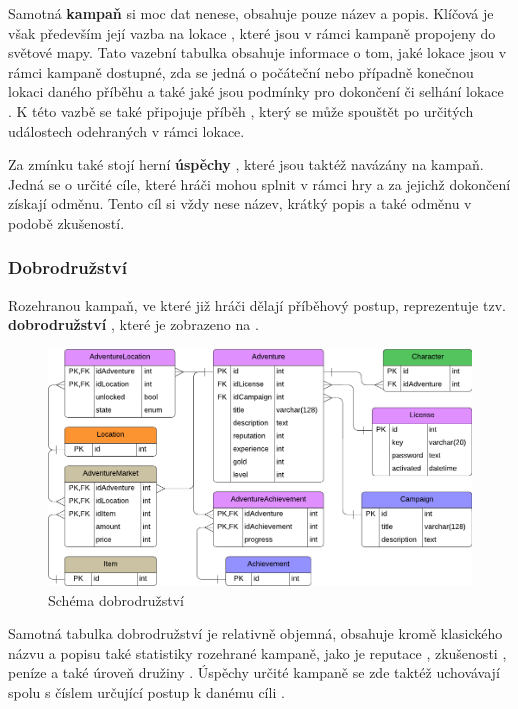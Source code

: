 Samotná \textbf{kampaň}  si moc dat nenese, obsahuje pouze název a popis. Klíčová je však především její vazba na lokace , které jsou v rámci kampaně propojeny do světové mapy. Tato vazební tabulka obsahuje informace o tom, jaké lokace jsou v rámci kampaně dostupné, zda se jedná o počáteční  nebo případně konečnou  lokaci daného příběhu a také jaké jsou podmínky pro dokončení či selhání lokace . K této vazbě se také připojuje příběh , který se může spouštět po určitých událostech odehraných v rámci lokace.

Za zmínku také stojí herní \textbf{úspěchy} , které jsou taktéž navázány na kampaň. Jedná se o určité cíle, které hráči mohou splnit v rámci hry a za jejichž dokončení získají odměnu. Tento cíl si vždy nese název, krátký popis a také odměnu v podobě zkušeností.


\subsubsection*{Dobrodružství}
\label{subsubsec:schema_adventure}

Rozehranou kampaň, ve které již hráči dělají příběhový postup, reprezentuje tzv. \textbf{dobrodružství} , které je zobrazeno na .

\begin{figure}[h]
    \centering
    \includegraphics[scale=0.8]{../../shared/diagrams/er_adventure.pdf}
    \caption{Schéma dobrodružství}
    \label{diag:er_adventure}
\end{figure}

Samotná tabulka dobrodružství je relativně objemná, obsahuje kromě klasického názvu a popisu také statistiky rozehrané kampaně, jako je reputace , zkušenosti , peníze  a také úroveň družiny . Úspěchy určité kampaně  se zde taktéž uchovávají spolu s číslem určující postup k danému cíli .

